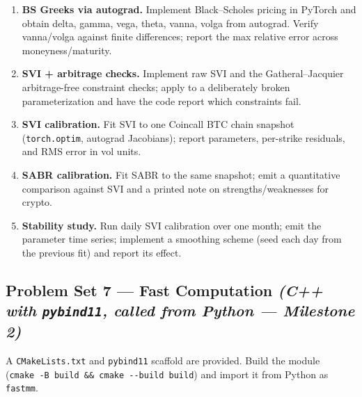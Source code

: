\documentclass[
]{article}
\providecommand{\tightlist}{%
  \setlength{\itemsep}{0pt}\setlength{\parskip}{0pt}}
\begin{document}
\begin{enumerate}
\def\labelenumi{\arabic{enumi}.}
\tightlist
\item
  \textbf{BS Greeks via autograd.} Implement Black--Scholes pricing in
  PyTorch and obtain delta, gamma, vega, theta, vanna, volga from
  autograd. Verify vanna/volga against finite differences; report the
  max relative error across moneyness/maturity.
\item
  \textbf{SVI + arbitrage checks.} Implement raw SVI and the
  Gatheral--Jacquier arbitrage-free constraint checks; apply to a
  deliberately broken parameterization and have the code report which
  constraints fail.
\item
  \textbf{SVI calibration.} Fit SVI to one Coincall BTC chain snapshot
  (\texttt{torch.optim}, autograd Jacobians); report parameters,
  per-strike residuals, and RMS error in vol units.
\item
  \textbf{SABR calibration.} Fit SABR to the same snapshot; emit a
  quantitative comparison against SVI and a printed note on
  strengths/weaknesses for crypto.
\item
  \textbf{Stability study.} Run daily SVI calibration over one month;
  emit the parameter time series; implement a smoothing scheme (seed
  each day from the previous fit) and report its effect.
\end{enumerate}

\subsection{\texorpdfstring{Problem Set 7 --- Fast Computation
\emph{(C++ with \texttt{pybind11}, called from Python --- Milestone
2)}}{Problem Set 7 --- Fast Computation (C++ with pybind11, called from Python --- Milestone 2)}}\label{problem-set-7-fast-computation-c-with-pybind11-called-from-python-milestone-2}

A \texttt{CMakeLists.txt} and \texttt{pybind11} scaffold are provided.
Build the module
(\texttt{cmake\ -B\ build\ \&\&\ cmake\ -\/-build\ build}) and import it
from Python as \texttt{fastmm}.
\end{document}
